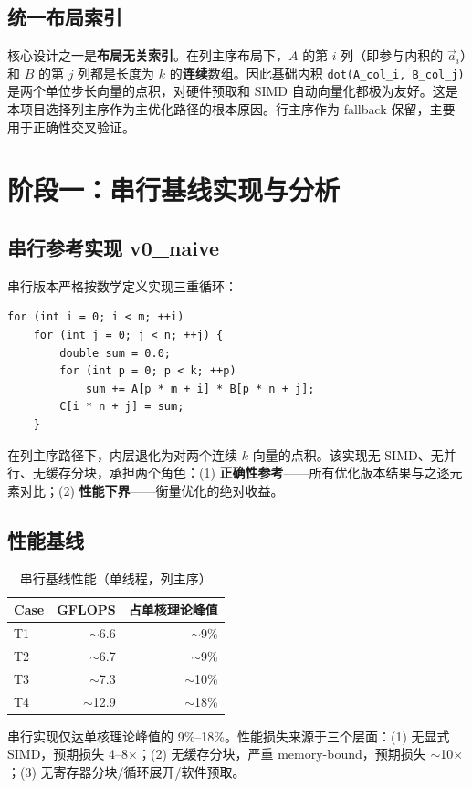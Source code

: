 \documentclass[11pt,a4paper,fontset=fandol]{ctexart}
\begin{document}
\subsection{统一布局索引}
核心设计之一是\textbf{布局无关索引}。在列主序布局下，$A$ 的第 $i$ 列（即参与内积的 $\vec{a}_i$）和 $B$ 的第 $j$ 列都是长度为 $k$ 的\textbf{连续}数组。因此基础内积 \texttt{dot(A\_col\_i, B\_col\_j)} 是两个单位步长向量的点积，对硬件预取和 SIMD 自动向量化都极为友好。这是本项目选择列主序作为主优化路径的根本原因。行主序作为 fallback 保留，主要用于正确性交叉验证。

\section{阶段一：串行基线实现与分析}

\subsection{串行参考实现 v0\_naive}
串行版本严格按数学定义实现三重循环：
\begin{lstlisting}
for (int i = 0; i < m; ++i)
    for (int j = 0; j < n; ++j) {
        double sum = 0.0;
        for (int p = 0; p < k; ++p)
            sum += A[p * m + i] * B[p * n + j];
        C[i * n + j] = sum;
    }
\end{lstlisting}
在列主序路径下，内层退化为对两个连续 $k$ 向量的点积。该实现无 SIMD、无并行、无缓存分块，承担两个角色：(1) \textbf{正确性参考}——所有优化版本结果与之逐元素对比；(2) \textbf{性能下界}——衡量优化的绝对收益。

\subsection{性能基线}
\begin{table}[H]
\centering
\caption{串行基线性能（单线程，列主序）}
\small
\begin{tabular}{lrr}
\toprule
Case & GFLOPS & 占单核理论峰值 \\
\midrule
T1 & $\sim$6.6 & $\sim$9\% \\
T2 & $\sim$6.7 & $\sim$9\% \\
T3 & $\sim$7.3 & $\sim$10\% \\
T4 & $\sim$12.9 & $\sim$18\% \\
\bottomrule
\end{tabular}
\end{table}
串行实现仅达单核理论峰值的 9\%--18\%。性能损失来源于三个层面：(1) 无显式 SIMD，预期损失 4--8$\times$；(2) 无缓存分块，严重 memory-bound，预期损失 $\sim$10$\times$；(3) 无寄存器分块/循环展开/软件预取。
\end{document}
